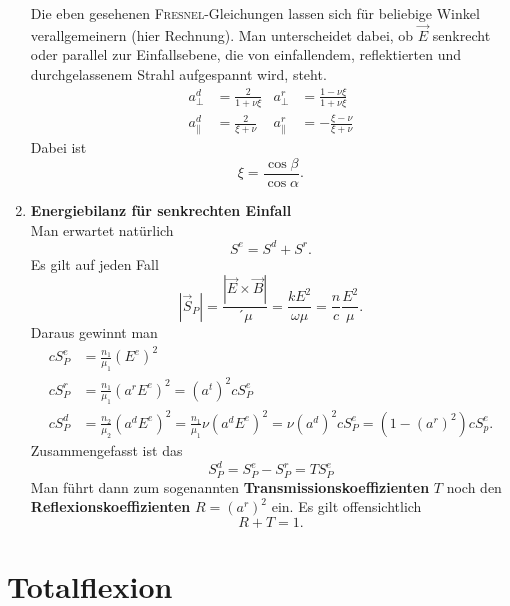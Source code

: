 \begin{enumerate}
Die eben gesehenen \textsc{Fresnel}-Gleichungen lassen sich für beliebige Winkel verallgemeinern (hier Rechnung). Man unterscheidet dabei, ob $\vec{E}$ senkrecht oder parallel zur Einfallsebene, die von einfallendem, reflektierten und durchgelassenem Strahl aufgespannt wird, steht.
\begin{align*}
a_\perp^d&=\frac{2}{1+\nu\xi} & a_\perp^r&=\frac{1-\nu\xi}{1+\nu\xi}\\
a_\parallel^d&=\frac{2}{\xi+\nu} &a_\parallel^r &=-\frac{\xi-\nu}{\xi+\nu}
\end{align*}
Dabei ist
\begin{equation*}
\xi=\frac{\cos\beta}{\cos\alpha}.
\end{equation*}

\item \textbf{ Energiebilanz für senkrechten Einfall}\\

Man erwartet natürlich
\begin{equation*}
S^e=S^d+S^r.
\end{equation*}
Es gilt auf jeden Fall
\begin{equation*}
|\vec{S}_P|=\frac{|\vec{E}\times\vec{B}|}{´\mu}=\frac{kE^2}{\omega\mu}=\frac{n}{c}\frac{E^2}{\mu}.
\end{equation*}
Daraus gewinnt man
\begin{align*}
cS_P^e &=\frac{n_1}{\mu_1}\left(E^e\right)^2 \\
cS_P^r &= \frac{n_1}{\mu_1}\left(a^rE^e\right)^2 = \left(a^t\right)^2cS_P^e\\
cS_P^d &=\frac{n_2}{\mu_2}\left(a^dE^e\right)^2 = \frac{n_1}{\mu_1}\nu\left(a^dE^e\right)^2 = \nu\left(a^d\right)^2cS_P^e=\left(1-\left(a^r\right)^2\right)cS_p^e.
\end{align*}
Zusammengefasst ist das
\begin{equation*}
S_P^d=S_P^e-S_P^r=TS_P^e
\end{equation*}
Man führt dann zum sogenannten \textbf{Transmissionskoeffizienten} $T$ noch den \textbf{Reflexionskoeffizienten} $R=\left(a^r\right)^2$ ein. Es gilt offensichtlich
\begin{equation*}
R+T=1.
\end{equation*}
\end{enumerate}


\section{Totalflexion}

